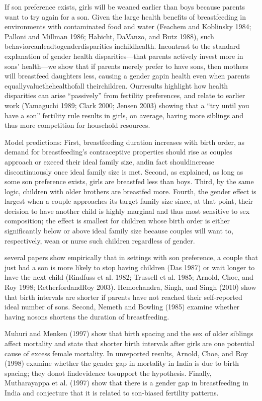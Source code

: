 \citep{Jayachandran2011}

If son preference exists, girls will be weaned earlier than boys because
parents want to try again for a son. Given the large health benefits of
breastfeeding in environments with contaminated food and water (Feachem
and Koblinsky 1984; Palloni and Millman 1986; Habicht, DaVanzo, and Butz
1988), such behaviorcanleadtogenderdisparities inchildhealth. Incontrast
to the standard explanation of gender health disparities—that parents
actively invest more in sons’ health—we show that if parents merely
prefer to have sons, then mothers will breastfeed daughters less,
causing a gender gapin health even when parents
equallyvaluethehealthofall theirchildren. Ourresults highlight how
health disparities can arise “passively” from fertility preferences, and
relate to earlier work (Yamaguchi 1989; Clark 2000; Jensen 2003) showing
that a “try until you have a son” fertility rule results in girls, on
average, having more siblings and thus more competition for household
resources.

Model predictions:
First, breastfeeding duration increases with birth order, as demand for
breastfeeding’s contraceptive properties should rise as couples approach
or exceed their ideal family size, andin fact shouldincrease
discontinuously once ideal family size is met.
Second, as explained, as long as some son preference exists, girls are
breastfed less than boys.
Third, by the same logic, children with older brothers are breastfed more.
Fourth, the gender effect is largest when a couple approaches its target
family size since, at that point, their decision to have another child
is highly marginal and thus most sensitive to sex composition; the
effect is smallest for children whose birth order is either
significantly below or above ideal family size because couples will want
to, respectively, wean or nurse such children regardless of gender.

several papers show empirically that in settings with son preference, a
couple that just had a son is more likely to stop having children (Das
1987) or wait longer to have the next child (Rindfuss et al. 1982;
Trussell et al. 1985; Arnold, Choe, and Roy 1998; RetherfordandRoy
2003). Hemochandra, Singh, and Singh (2010) show that birth intervals
are shorter if parents have not reached their self-reported ideal number
of sons. Second, Nemeth and Bowling (1985) examine whether having nosons
shortens the duration of breastfeeding.

Muhuri and Menken (1997) show that birth spacing and the sex of older
siblings affect mortality and state that shorter birth intervals after
girls are one potential cause of excess female mortality. In unreported
results, Arnold, Choe, and Roy (1998) examine whether the gender gap in
mortality in India is due to birth spacing; they donot findevidence
tosupport the hypothesis. Finally, Mutharayappa et al. (1997) show that
there is a gender gap in breastfeeding in India and conjecture that it
is related to son-biased fertility patterns.

